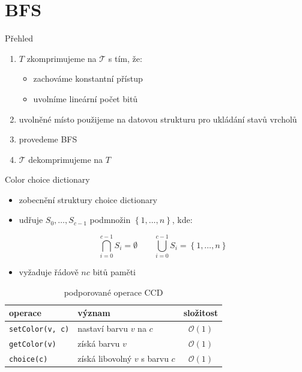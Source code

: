 \documentclass[czech]{beamer}
\begin{document}
	\section{BFS}
	\begin{frame}{Přehled}
		\begin{enumerate}
			\item $T$ zkomprimujeme na $\mathcal{T}$ s tím, že:
			\begin{itemize}
				\item zachováme konstantní přístup
				\item uvolníme lineární počet bitů
			\end{itemize}
			\item uvolněné místo použijeme na datovou strukturu pro ukládání stavů vrcholů
			\item provedeme BFS
			\item $\mathcal{T}$ dekomprimujeme na $T$
		\end{enumerate}
	\end{frame}

	\begin{frame}{Color choice dictionary}
		\begin{itemize}
			\item zobecnění struktury choice dictionary
			\item udřuje $S_0, \ldots, S_{c - 1}$ podmnožin $\left\{1, \ldots, n\right\}$, kde:

				$$\bigcap_{i=0}^{c-1} S_i = \emptyset \qquad\bigcup_{i=0}^{c-1} S_i = \left\{1, \ldots, n\right\}$$

			\item vyžaduje řádově $nc$ bitů paměti
		\end{itemize}

		\vfill

		\begin{table}
			\centering
			\begin{tabular}{llc}
				\toprule
				operace & význam & složitost \\
				\midrule
				\texttt{setColor(v, c)} & nastaví barvu $v$ na $c$        & $\mathcal{O}\left(1\right)$ \\
				\texttt{getColor(v)}    & získá barvu $v$                 & $\mathcal{O}\left(1\right)$ \\
				\texttt{choice(c)}      & získá libovolný $v$ s barvu $c$ & $\mathcal{O}\left(1\right)$ \\
				\bottomrule
			\end{tabular}
			\caption{podporované operace CCD}
		\end{table}
	\end{frame}
\end{document}
